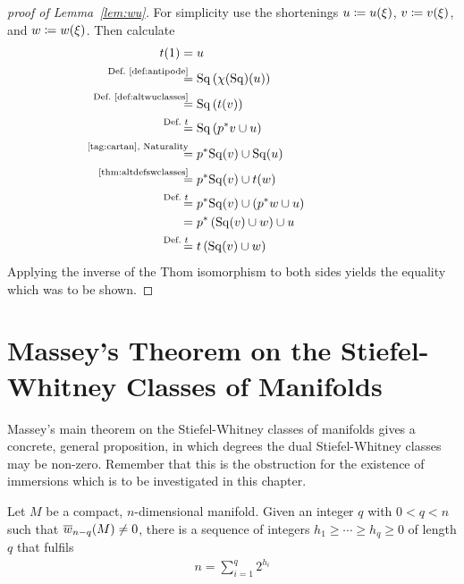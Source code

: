 \begin{proof}[proof of Lemma~\ref{lem:wu}]
  For simplicity use the shortenings
  $u\coloneqq {u}(\xi)$,
  $v\coloneqq {v}(\xi)$, and
  $w\coloneqq {w}(\xi)$.
  Then calculate
  \begin{align*}
    \thomiso(1)
    &= \U
    \\
    &\equalsby{Def.~\ref{def:antipode}}
      \SQ\left(\antipode(\SQ)(\U)\right)
    \\
    &\equalsby{Def.~\ref{def:altwuclasses}}
      \SQ\left(\thomiso(\Vu)\right)
    \\
    &\equalsby{Def.~$\thomiso$}
      \SQ\left(\pb p\Vu \cup \U\right)
    \\
    &\equalsby{\ref{tag:cartan}, Naturality}
      \pb p\SQ(\Vu) \cup \SQ(\U)
    \\
    &\equalsby{\ref{thm:altdefswclasses}}
      \pb p\SQ(\Vu) \cup \thomiso(\Ws)
    \\
    &\equalsby{Def.~$\thomiso$}
      \pb p\SQ(\Vu) \cup \left(\pb p \Ws \cup \U\right)
    \\
    &=
      \pb p\left(\SQ(\Vu) \cup \Ws\right) \cup \U
    \\
    &\equalsby{Def.~$\thomiso$}
      \thomiso\left(\SQ(\Vu) \cup \Ws\right)
  \end{align*}
  Applying the inverse of the Thom isomorphism to both sides
  yields the equality which was to be shown.
\end{proof}


\section{Massey's Theorem on the Stiefel-Whitney Classes of Manifolds}
\label{sec:massey}
Massey's main theorem on the Stiefel-Whitney classes of manifolds
gives a concrete, general proposition, in which degrees the dual
Stiefel-Whitney classes may be non-zero. Remember that this is the
obstruction for the existence of immersions which is to be
investigated in this chapter.
\begin{Thm}[Massey]\label{thm:massey}
  Let $M$ be a compact, $n$-dimensional manifold.
  Given an integer $q$ with $0<q<n$ such that ${\overline{w}_{n-q}}(M)\neq0$,
  there is a sequence of integers $h_1\geq\dotsb\geq h_q\geq0$ of
  length $q$ that fulfils
  \begin{gather*}
    n = \sum_{i=1}^{q} 2^{h_i}
  \end{gather*}
\end{Thm}

